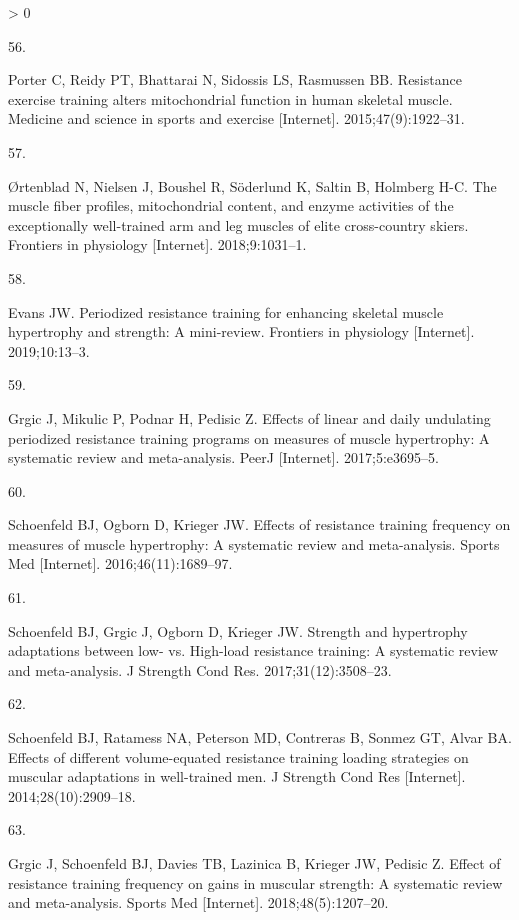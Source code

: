 \documentclass[twoside,10pt]{gihclass} %
\newlength{\cslhangindent}
\newlength{\csllabelwidth}
\newenvironment{CSLReferences}[3] %
 {%
  \setlength{\parindent}{0pt}
  \ifodd #1 \everypar{\setlength{\hangindent}{\cslhangindent}}\ignorespaces\fi
  \ifnum #2 > 0
  \setlength{\parskip}{#2\baselineskip}
  \fi
 }%
 {}
\newcommand{\CSLLeftMargin}[1]{\parbox[t]{\maxof{\widthof{#1}}{\csllabelwidth}}{#1}}
\newcommand{\CSLRightInline}[1]{\parbox[t]{\linewidth}{#1}}
\begin{document}
\begin{CSLReferences}{0}{0}
\leavevmode\hypertarget{ref-RN2608}{}%
\CSLLeftMargin{56. }
\CSLRightInline{Porter C, Reidy PT, Bhattarai N, Sidossis LS, Rasmussen BB. Resistance exercise training alters mitochondrial function in human skeletal muscle. Medicine and science in sports and exercise {[}Internet{]}. 2015;47(9):1922--31. }

\leavevmode\hypertarget{ref-RN2615}{}%
\CSLLeftMargin{57. }
\CSLRightInline{Ørtenblad N, Nielsen J, Boushel R, Söderlund K, Saltin B, Holmberg H-C. The muscle fiber profiles, mitochondrial content, and enzyme activities of the exceptionally well-trained arm and leg muscles of elite cross-country skiers. Frontiers in physiology {[}Internet{]}. 2018;9:1031--1. }

\leavevmode\hypertarget{ref-RN2575}{}%
\CSLLeftMargin{58. }
\CSLRightInline{Evans JW. Periodized resistance training for enhancing skeletal muscle hypertrophy and strength: A mini-review. Frontiers in physiology {[}Internet{]}. 2019;10:13--3. }

\leavevmode\hypertarget{ref-RN2572}{}%
\CSLLeftMargin{59. }
\CSLRightInline{Grgic J, Mikulic P, Podnar H, Pedisic Z. Effects of linear and daily undulating periodized resistance training programs on measures of muscle hypertrophy: A systematic review and meta-analysis. PeerJ {[}Internet{]}. 2017;5:e3695--5. }

\leavevmode\hypertarget{ref-RN2571}{}%
\CSLLeftMargin{60. }
\CSLRightInline{Schoenfeld BJ, Ogborn D, Krieger JW. Effects of resistance training frequency on measures of muscle hypertrophy: A systematic review and meta-analysis. Sports Med {[}Internet{]}. 2016;46(11):1689--97. }

\leavevmode\hypertarget{ref-RN2569}{}%
\CSLLeftMargin{61. }
\CSLRightInline{Schoenfeld BJ, Grgic J, Ogborn D, Krieger JW. Strength and hypertrophy adaptations between low- vs. High-load resistance training: A systematic review and meta-analysis. J Strength Cond Res. 2017;31(12):3508--23. }

\leavevmode\hypertarget{ref-RN1612}{}%
\CSLLeftMargin{62. }
\CSLRightInline{Schoenfeld BJ, Ratamess NA, Peterson MD, Contreras B, Sonmez GT, Alvar BA. Effects of different volume-equated resistance training loading strategies on muscular adaptations in well-trained men. J Strength Cond Res {[}Internet{]}. 2014;28(10):2909--18. }

\leavevmode\hypertarget{ref-RN2570}{}%
\CSLLeftMargin{63. }
\CSLRightInline{Grgic J, Schoenfeld BJ, Davies TB, Lazinica B, Krieger JW, Pedisic Z. Effect of resistance training frequency on gains in muscular strength: A systematic review and meta-analysis. Sports Med {[}Internet{]}. 2018;48(5):1207--20. }


\end{CSLReferences}
\end{document}
